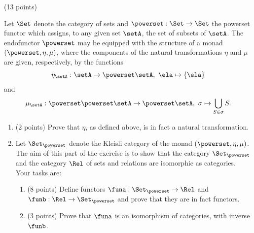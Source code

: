 \documentclass[paper=8.125in:10.250in,pagesize=pdftex,
    headinclude=false,footinclude=false,oneside,egregdoesnotlikesansseriftitles]{kaobook}
\begin{document}

\newpage


\begin{gradedexercise}\label{ex:RelKleisli} (13 points) 

Let $\Set$ denote the category of sets and $\powerset : \Set \to \Set$ the powerset functor which assigns, to any given set $\setA$, the set of subsets of $\setA$. The endofunctor $\powerset$ may be equipped with the structure of a monad $(\powerset, \eta, \mu)$, where the components of the natural transformations $\eta$ and $\mu$ are given, respectively, by the functions
$$ \eta_{\setA} : \setA \to \powerset \setA, \ \ela \mapsto \{ \ela \}$$
and
$$ \mu_{\setA} : \powerset \powerset \setA \to \powerset \setA, \ \sigma \mapsto \bigcup_{S \in \sigma} S.$$

\begin{enumerate}
\item (2 points) Prove that $\eta$, as defined above, is in fact a natural transformation. 
\item Let $\Set_{\powerset}$ denote the Kleisli category of the monad $(\powerset, \eta, \mu)$. The aim of this part of the exercise is to show that the category $\Set_{\powerset}$ and the category $\Rel$ of sets and relations are isomorphic as categories. Your tasks are:
\begin{enumerate}
\item (8 points) Define functors $\funa: \Set_{\powerset} \to \Rel$ and $\funb: \Rel \to \Set_{\powerset}$ and prove that they are in fact functors. 
\item (3 points) Prove that $\funa$ is an isomorphism of categories, with inverse $\funb$. 
\end{enumerate}
\end{enumerate}
\end{gradedexercise}


\newpage
\end{document}
